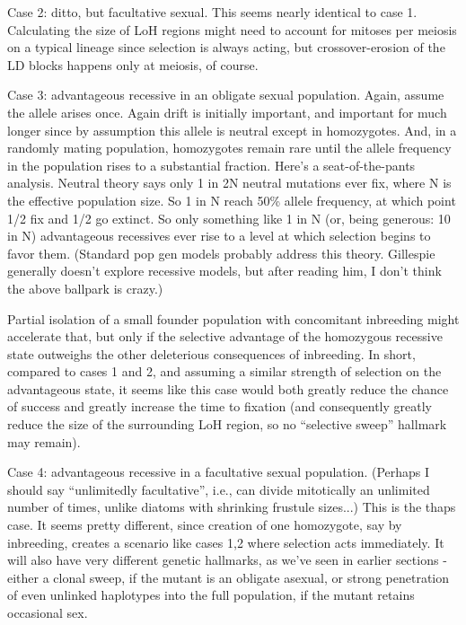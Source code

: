 \documentclass{article}\usepackage[]{graphicx}\usepackage[]{color}
\begin{document}
Case 2: ditto, but facultative sexual. This seems nearly identical to case 1.  Calculating the size
of LoH regions might need to account for mitoses per meiosis on a typical lineage since selection is
always acting, but crossover-erosion of the LD blocks happens only at meiosis, of course.

Case 3: advantageous recessive in an obligate sexual population.  Again, assume the allele arises
once.  Again drift is initially important, and important for much longer since by assumption this
allele is neutral except in homozygotes.  And, in a randomly mating population, homozygotes remain
rare until the allele frequency in the population rises to a substantial fraction.  Here's a
seat-of-the-pants analysis.  Neutral theory says only 1 in 2N neutral mutations ever fix, where N is
the effective population size.  So 1 in N reach 50\% allele frequency, at which point 1/2 fix and
1/2 go extinct.  So only something like 1 in N (or, being generous: 10 in N) advantageous recessives
ever rise to a level at which selection begins to favor them.  (Standard pop gen models probably 
address this theory.  Gillespie generally doesn't explore recessive models, but after reading him, 
I don't think the above ballpark is crazy.)

Partial isolation of a small founder population with concomitant inbreeding might accelerate that,
but only if the selective advantage of the homozygous recessive state outweighs the other
deleterious consequences of inbreeding.  In short, compared to cases 1 and 2, and assuming a similar
strength of selection on the advantageous state, it seems like this case would both greatly reduce
the chance of success and greatly increase the time to fixation (and consequently greatly reduce the
size of the surrounding LoH region, so no ``selective sweep'' hallmark may remain).

Case 4: advantageous recessive in a facultative sexual population.  (Perhaps I should say
``unlimitedly facultative'', i.e., can divide mitotically an unlimited number of times, unlike
diatoms with shrinking frustule sizes...) This is the thaps case.  It seems pretty different, since
creation of one homozygote, say by inbreeding, creates a scenario like cases 1,2 where selection
acts immediately.  It will also have very different genetic hallmarks, as we've seen in earlier
sections - either a clonal sweep, if the mutant is an obligate asexual, or strong penetration of
even unlinked haplotypes into the full population, if the mutant retains occasional sex.
\end{document}
